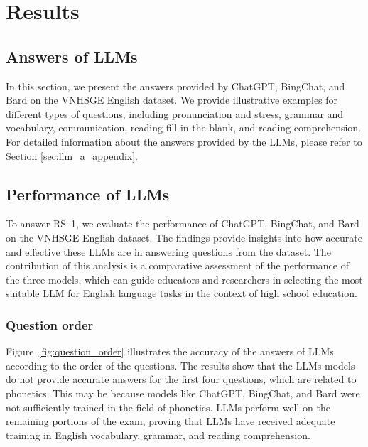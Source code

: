 \documentclass[11pt]{article}
\begin{document}
\section{Results}

\subsection{Answers of LLMs}

In this section, we present the answers provided by ChatGPT, BingChat, and Bard on the VNHSGE English dataset. We provide illustrative examples for different types of questions, including pronunciation and stress, grammar and vocabulary, communication, reading fill-in-the-blank, and reading comprehension. For detailed information about the answers provided by the LLMs, please refer to Section \ref{sec:llm_a_appendix}.

\subsection{Performance of LLMs}

To answer RS~1, we evaluate the performance of ChatGPT, BingChat, and Bard on the VNHSGE English dataset. The findings provide insights into how accurate and effective these LLMs are in answering questions from the dataset. The contribution of this analysis is a comparative assessment of the performance of the three models, which can guide educators and researchers in selecting the most suitable LLM for English language tasks in the context of high school education.

\subsubsection{Question order}

Figure~\ref{fig:question_order} illustrates the accuracy of the answers of LLMs according to the order of the questions. The results show that the LLMs models do not provide accurate answers for the first four questions, which are related to phonetics. This may be because models like ChatGPT, BingChat, and Bard were not sufficiently trained in the field of phonetics. LLMs perform well on the remaining portions of the exam, proving that LLMs have received adequate training in English vocabulary, grammar, and reading comprehension.
\end{document}
